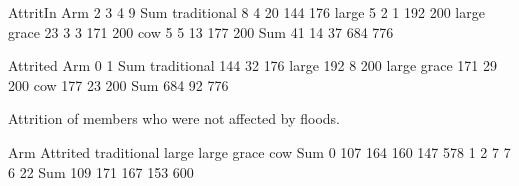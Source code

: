 \begin{Schunk}
\begin{Soutput}
             AttritIn
Arm             2   3   4   9 Sum
  traditional   8   4  20 144 176
  large         5   2   1 192 200
  large grace  23   3   3 171 200
  cow           5   5  13 177 200
  Sum          41  14  37 684 776
\end{Soutput}
\end{Schunk}
\begin{Schunk}
\begin{Soutput}
             Attrited
Arm             0   1 Sum
  traditional 144  32 176
  large       192   8 200
  large grace 171  29 200
  cow         177  23 200
  Sum         684  92 776
\end{Soutput}
\end{Schunk}
Attrition of members who were not affected by floods.
\begin{Schunk}
\begin{Soutput}
        Arm
Attrited traditional large large grace cow Sum
     0           107   164         160 147 578
     1             2     7           7   6  22
     Sum         109   171         167 153 600
\end{Soutput}
\end{Schunk}












